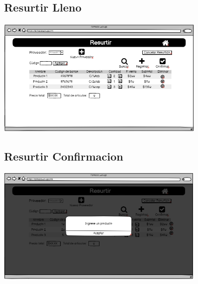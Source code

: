 \begin{flushleft}
	\subsection{Resurtir Lleno} \label{UI: resurtir lleno}
	\begin{center}
		\includegraphics[width=10cm]{pantallas/images/15resurtirlleno.png}\\	
		 	
	\end{center}
	\subsection{Resurtir Confirmacion} \label{UI: resurtir confirmación}
	\begin{center}
		\includegraphics[width=10cm]{pantallas/images/16resurtirconfirmacion.png}\\	
		 	
	\end{center}

\end{flushleft}
